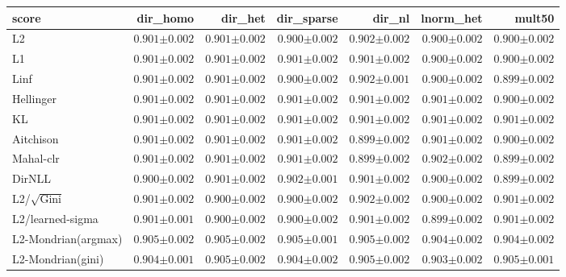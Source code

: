 \begin{tabular}{lrrrrrr}
\toprule
score & dir\_homo & dir\_het & dir\_sparse & dir\_nl & lnorm\_het & mult50 \\
\midrule
L2 & $0.901{\scriptstyle\pm0.002}$ & $0.901{\scriptstyle\pm0.002}$ & $0.900{\scriptstyle\pm0.002}$ & $0.902{\scriptstyle\pm0.002}$ & $0.900{\scriptstyle\pm0.002}$ & $0.900{\scriptstyle\pm0.002}$ \\
L1 & $0.901{\scriptstyle\pm0.002}$ & $0.901{\scriptstyle\pm0.002}$ & $0.901{\scriptstyle\pm0.002}$ & $0.901{\scriptstyle\pm0.002}$ & $0.900{\scriptstyle\pm0.002}$ & $0.900{\scriptstyle\pm0.002}$ \\
Linf & $0.901{\scriptstyle\pm0.002}$ & $0.901{\scriptstyle\pm0.002}$ & $0.900{\scriptstyle\pm0.002}$ & $0.902{\scriptstyle\pm0.001}$ & $0.900{\scriptstyle\pm0.002}$ & $0.899{\scriptstyle\pm0.002}$ \\
Hellinger & $0.901{\scriptstyle\pm0.002}$ & $0.901{\scriptstyle\pm0.002}$ & $0.901{\scriptstyle\pm0.002}$ & $0.901{\scriptstyle\pm0.002}$ & $0.901{\scriptstyle\pm0.002}$ & $0.900{\scriptstyle\pm0.002}$ \\
KL & $0.901{\scriptstyle\pm0.002}$ & $0.901{\scriptstyle\pm0.002}$ & $0.901{\scriptstyle\pm0.002}$ & $0.901{\scriptstyle\pm0.002}$ & $0.901{\scriptstyle\pm0.002}$ & $0.901{\scriptstyle\pm0.002}$ \\
Aitchison & $0.901{\scriptstyle\pm0.002}$ & $0.901{\scriptstyle\pm0.002}$ & $0.901{\scriptstyle\pm0.002}$ & $0.899{\scriptstyle\pm0.002}$ & $0.901{\scriptstyle\pm0.002}$ & $0.900{\scriptstyle\pm0.002}$ \\
Mahal-clr & $0.901{\scriptstyle\pm0.002}$ & $0.901{\scriptstyle\pm0.002}$ & $0.901{\scriptstyle\pm0.002}$ & $0.899{\scriptstyle\pm0.002}$ & $0.902{\scriptstyle\pm0.002}$ & $0.899{\scriptstyle\pm0.002}$ \\
DirNLL & $0.900{\scriptstyle\pm0.002}$ & $0.901{\scriptstyle\pm0.002}$ & $0.902{\scriptstyle\pm0.001}$ & $0.901{\scriptstyle\pm0.002}$ & $0.900{\scriptstyle\pm0.002}$ & $0.899{\scriptstyle\pm0.002}$ \\
L2/$\sqrt{\mathrm{Gini}}$ & $0.901{\scriptstyle\pm0.002}$ & $0.900{\scriptstyle\pm0.002}$ & $0.900{\scriptstyle\pm0.002}$ & $0.902{\scriptstyle\pm0.002}$ & $0.900{\scriptstyle\pm0.002}$ & $0.901{\scriptstyle\pm0.002}$ \\
L2/learned-sigma & $0.901{\scriptstyle\pm0.001}$ & $0.900{\scriptstyle\pm0.002}$ & $0.900{\scriptstyle\pm0.002}$ & $0.901{\scriptstyle\pm0.002}$ & $0.899{\scriptstyle\pm0.002}$ & $0.901{\scriptstyle\pm0.002}$ \\
L2-Mondrian(argmax) & $0.905{\scriptstyle\pm0.002}$ & $0.905{\scriptstyle\pm0.002}$ & $0.905{\scriptstyle\pm0.001}$ & $0.905{\scriptstyle\pm0.002}$ & $0.904{\scriptstyle\pm0.002}$ & $0.904{\scriptstyle\pm0.002}$ \\
L2-Mondrian(gini) & $0.904{\scriptstyle\pm0.001}$ & $0.905{\scriptstyle\pm0.002}$ & $0.904{\scriptstyle\pm0.002}$ & $0.905{\scriptstyle\pm0.002}$ & $0.903{\scriptstyle\pm0.002}$ & $0.905{\scriptstyle\pm0.001}$ \\
\bottomrule
\end{tabular}